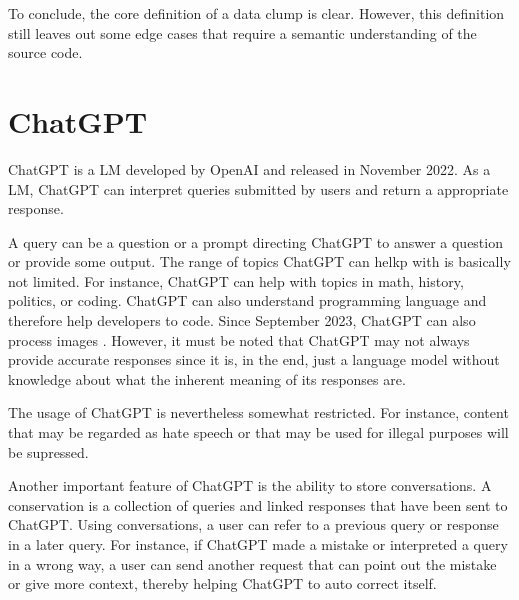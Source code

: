 To conclude, the core definition of a data clump is clear. However, this definition still leaves out some edge cases that require a semantic understanding of the source code.  


\section{ChatGPT}

ChatGPT \cite{ChatGPT_url} is a \ac{LM} developed by OpenAI and released in November 2022. As a \ac{LM}, ChatGPT can interpret queries submitted by users and return a appropriate response. 

A query can be a question or a prompt directing ChatGPT to answer a question or provide some output. The range of topics ChatGPT can helkp with is basically not limited. For instance, ChatGPT can help with topics in math, history, politics, or coding. ChatGPT can also understand programming language and therefore help developers to code.  Since September 2023, ChatGPT can also process images \cite{ChatGPT_image}. However, it must be noted that ChatGPT may not always provide accurate responses since it is, in the end, just a language model without knowledge about what the inherent meaning of its responses are. 

The usage of ChatGPT is nevertheless somewhat restricted. For instance, content that may be regarded as hate speech or that may be used for illegal purposes will be supressed.

Another important feature of ChatGPT is the ability to store conversations. A conservation is a collection of queries and linked responses that have been sent to ChatGPT. Using conversations, a user can refer to a previous query or response in a later query. For instance, if ChatGPT made a mistake or interpreted a query in a wrong way, a user can send another request that can point out the mistake or give more context, thereby helping ChatGPT to auto correct itself. 
